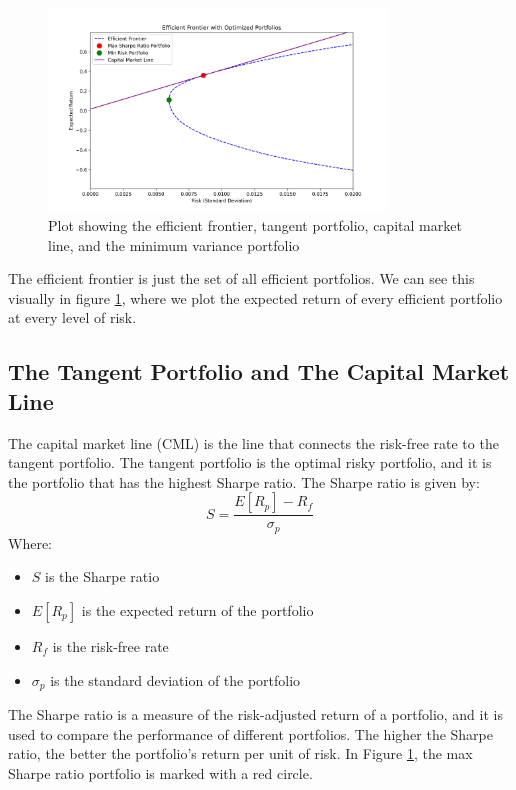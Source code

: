 \begin{figure}
    \centering
    \includegraphics[width=0.8\textwidth]{../figs/efficient_frontier.png}
    \caption{Plot showing the efficient frontier, tangent portfolio, capital market line, and the minimum variance portfolio}
    \label{fig:efficient_frontier}
\end{figure}
The efficient frontier is just the set of all efficient portfolios.
We can see this visually in figure \ref{fig:efficient_frontier}, where we plot the expected return of every efficient portfolio at every level of risk.

\subsection{The Tangent Portfolio and The Capital Market Line}

The capital market line (CML) is the line that connects the risk-free rate to the tangent portfolio.
The tangent portfolio is the optimal risky portfolio, and it is the portfolio that has the highest Sharpe ratio.
The Sharpe ratio is given by:
\begin{equation}
    \label{eq:sharpe_ratio}
    S = \frac{E[R_p] - R_f}{\sigma_p}
\end{equation}
Where:
\begin{itemize}
    \item $S$ is the Sharpe ratio
    \item $E[R_p]$ is the expected return of the portfolio
    \item $R_f$ is the risk-free rate
    \item $\sigma_p$ is the standard deviation of the portfolio
\end{itemize}

The Sharpe ratio is a measure of the risk-adjusted return of a portfolio, and it is used to compare the performance of different portfolios.
The higher the Sharpe ratio, the better the portfolio's return per unit of risk. In Figure \ref{fig:efficient_frontier}, the max Sharpe ratio portfolio is marked with a red circle.

